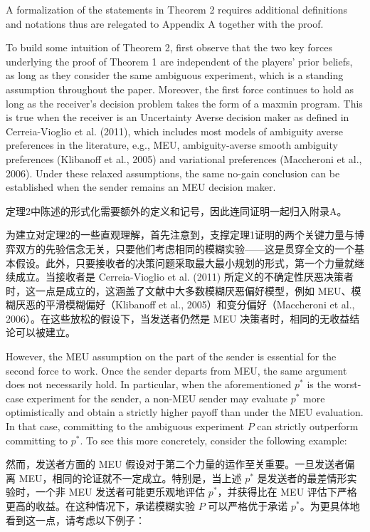 \documentclass[12pt,a4paper]{article}
\theoremstyle{definition}
\theoremstyle{remark}
\newenvironment{original}{%
    \par\medskip\noindent%
    \begin{tcolorbox}[%
        colback=white,%
        colframe=black!50,%
        title=\textbf{Original English},%
        fonttitle=\small\bfseries,%
        left=0pt, right=0pt, top=2pt, bottom=2pt,%
        boxrule=0.5pt,%
        arc=0pt,%
        outer arc=0pt%
    ]%
    \small%
}{%
    \end{tcolorbox}%
}
\newenvironment{translation}{%
    \par\smallskip\noindent%
    \begin{tcolorbox}[%
        colback=blue!3!white,%
        colframe=blue!40!black,%
        title=\textbf{中文翻译},%
        fonttitle=\small\bfseries,%
        left=0pt, right=0pt, top=2pt, bottom=2pt,%
        boxrule=0.5pt,%
        arc=0pt,%
        outer arc=0pt%
    ]%
    \small\color{blue!60!black}%
}{%
    \end{tcolorbox}\medskip%
}
\begin{document}
\begin{original}
A formalization of the statements in Theorem 2 requires additional definitions and notations thus are relegated to Appendix A together with the proof.

To build some intuition of Theorem 2, first observe that the two key forces underlying the proof of Theorem 1 are independent of the players' prior beliefs, as long as they consider the same ambiguous experiment, which is a standing assumption throughout the paper. Moreover, the first force continues to hold as long as the receiver's decision problem takes the form of a maxmin program. This is true when the receiver is an Uncertainty Averse decision maker as defined in Cerreia-Vioglio et al. (2011), which includes most models of ambiguity averse preferences in the literature, e.g., MEU, ambiguity-averse smooth ambiguity preferences (Klibanoff et al., 2005) and variational preferences (Maccheroni et al., 2006). Under these relaxed assumptions, the same no-gain conclusion can be established when the sender remains an MEU decision maker.
\end{original}
\begin{translation}
定理2中陈述的形式化需要额外的定义和记号，因此连同证明一起归入附录A。

为建立对定理2的一些直观理解，首先注意到，支撑定理1证明的两个关键力量与博弈双方的先验信念无关，只要他们考虑相同的模糊实验——这是贯穿全文的一个基本假设。此外，只要接收者的决策问题采取最大最小规划的形式，第一个力量就继续成立。当接收者是 Cerreia-Vioglio et al. (2011) 所定义的不确定性厌恶决策者时，这一点是成立的，这涵盖了文献中大多数模糊厌恶偏好模型，例如 MEU、模糊厌恶的平滑模糊偏好（Klibanoff et al., 2005）和变分偏好（Maccheroni et al., 2006）。在这些放松的假设下，当发送者仍然是 MEU 决策者时，相同的无收益结论可以被建立。
\end{translation}

\begin{original}
However, the MEU assumption on the part of the sender is essential for the second force to work. Once the sender departs from MEU, the same argument does not necessarily hold. In particular, when the aforementioned $p^*$ is the worst-case experiment for the sender, a non-MEU sender may evaluate $p^*$ more optimistically and obtain a strictly higher payoff than under the MEU evaluation. In that case, committing to the ambiguous experiment $P$ can strictly outperform committing to $p^*$. To see this more concretely, consider the following example:
\end{original}
\begin{translation}
然而，发送者方面的 MEU 假设对于第二个力量的运作至关重要。一旦发送者偏离 MEU，相同的论证就不一定成立。特别是，当上述 $p^*$ 是发送者的最差情形实验时，一个非 MEU 发送者可能更乐观地评估 $p^*$，并获得比在 MEU 评估下严格更高的收益。在这种情况下，承诺模糊实验 $P$ 可以严格优于承诺 $p^*$。为更具体地看到这一点，请考虑以下例子：
\end{translation}
\end{document}
